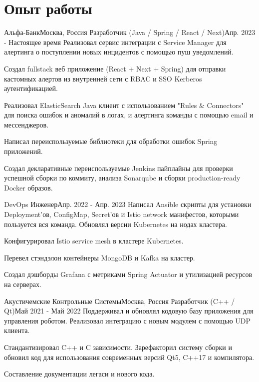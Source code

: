 

\section{Опыт работы}\label{sec:experience}
\resumeSubHeadingListStart

\resumeSubheading
{Альфа-Банк}{Москва, Россия}
    {Разработчик (Java / Spring / React / Next)}{Апр. 2023 - Настоящее время}
    \resumeItemListStart
        {Реализовал сервис интеграции с Service Manager для алертинга о поступлении новых инцидентов с помощью пуш уведомлений.}

        {Создал fullstack веб приложение (React + Next + Spring) для отправки кастомных алертов из внутренней сети с RBAC и SSO Kerberos аутентификацией.}

        {Реализовал ElasticSearch Java клиент с использованием "Rules \& Connectors" для поиска ошибок и аномалий в логах, и алертинга команды с помощью email и мессенджеров.}

        {Написал переиспользуемые библиотеки для обработки ошибок Spring приложений.}

        {Создал декларативные переиспользуемые Jenkins пайплайны для проверки успешной сборки по коммиту, анализа Sonarqube и сборки production-ready Docker образов.}
    \resumeItemListEnd

\resumeSubSubheading
{DevOps Инженер}{Апр. 2022 - Апр. 2023}
    \resumeItemListStart
        {Написал Ansible скрипты для установки Deployment'ов, ConfigMap, Secret'ов и Istio network манифестов, которыми пользуется вся команда. Обновлял версии Kubernetes на нодах кластера.}

        {Конфигурировал Istio service mesh в кластере Kubernetes.}

        {Перевел стэндэлон контейнеры MongoDB и Kafka на кластер.}

        {Создал дэшборды Grafana с метриками Spring Actuator и утилизацией ресурсов на серверах.}
    \resumeItemListEnd

\resumeSubheading
{Акустичемские Контрольные Системы}{Москва, Россия}
    {Разработчик (C++ / Qt)}{Май 2021 - Май 2022}
    \resumeItemListStart
        {Поддерживал и обновлял кодовую базу приложения для управления роботом. Реализовал интеграцию с новым модулем с помощью UDP клиента.}

        {Стандантизировал C++ и C зависимости. Зарефакторил систему сборки и обновил код для использования современных версий Qt5, C++17 и компилятора.}

        {Составление документации легаси и нового кода.}
    \resumeItemListEnd
\resumeSubHeadingListEnd